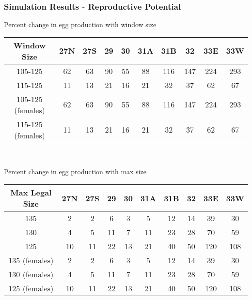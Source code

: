 \documentclass{beamer}
\begin{document}
\begin{frame}
\frametitle{Simulation Results - Reproductive Potential}
Percent change in egg production with window size 
\centering
\begin{tabular}{|c|c|c|c|c|c|c|c|c|c|}
\hline
Window Size       & 27N & 27S & 29 & 30 & 31A & 31B & 32 & 33E & 33W \\
\hline
105-125           & 62 & 63 & 90 & 55 & 88 & 116 & 147 & 224 & 293 \\
\hline
115-125           & 11 & 13 & 21 & 16 & 21 & 32 & 37 & 62 & 67 \\
\hline
105-125 (females) & 62 & 63 & 90 & 55 & 88 & 116 & 147 & 224 & 293 \\
\hline
115-125 (females) & 11 & 13 & 21 & 16 & 21 & 32 & 37 & 62 & 67 \\
\hline
 
\end{tabular}\\

\vspace{5mm}

Percent change in egg production with max size 
\centering
\begin{tabular}{|c|c|c|c|c|c|c|c|c|c|}
\hline
Max Legal Size & 27N & 27S & 29 & 30 & 31A & 31B & 32 & 33E & 33W \\
\hline
135            & 2 & 2 & 6 & 3 & 5 & 12 & 14 & 39 & 30 \\
\hline
130            & 4 & 5 & 11 & 7 & 11 & 23 & 28 & 70 & 59 \\
\hline
125            & 10 & 11 & 22 & 13 & 21 & 40 & 50 & 120 & 108 \\
\hline
135 (females)   & 2 & 2 & 6 & 3 & 5 & 12 & 14 & 39 & 30 \\
\hline
130 (females)   & 4 & 5 & 11 & 7 & 11 & 23 & 28 & 70 & 59 \\
\hline
125 (females)   & 10 & 11 & 22 & 13 & 21 & 40 & 50 & 120 & 108 \\
\hline
 
\end{tabular}
\end{frame}
\end{document}
